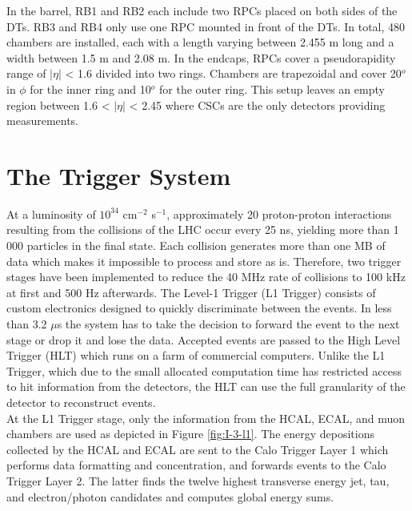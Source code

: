       In the barrel, RB1 and RB2 each include two RPCs placed on both sides of the DTs. RB3 and RB4 only use one RPC mounted in front of the DTs. In total, 480 chambers are installed, each with a length varying between 2.455 m long and a width between 1.5 m and 2.08 m. In the endcaps, RPCs cover a pseudorapidity range of $ | \eta | $ < 1.6 divided into two rings. Chambers are trapezoidal and cover 20$^o$ in $ \phi $ for the inner ring and 10$^o$ for the outer ring. This setup leaves an empty region between 1.6 < $ | \eta | $ < 2.45 where CSCs are the only detectors providing measurements.

  \section{The Trigger System}

    At a luminosity of $ 10^{34} $ cm$^{-2}$ s$^{-1}$, approximately 20 proton-proton interactions resulting from the collisions of the LHC occur every 25 ns, yielding more than 1 000 particles in the final state. Each collision generates more than one MB of data which makes it impossible to process and store as is. Therefore, two trigger stages have been implemented to reduce the 40 MHz rate of collisions to 100 kHz at first and 500 Hz afterwards. The Level-1 Trigger (L1 Trigger) consists of custom electronics designed to quickly discriminate between the events. In less than 3.2 $\mu$s the system has to take the decision to forward the event to the next stage or drop it and lose the data. Accepted events are passed to the High Level Trigger (HLT) which runs on a farm of commercial computers. Unlike the L1 Trigger, which due to the small allocated computation time has restricted access to hit information from the detectors, the HLT can use the full granularity of the detector to reconstruct events. \\

    At the L1 Trigger stage, only the information from the HCAL, ECAL, and muon chambers are used as depicted in Figure \ref{fig:I-3-l1}. The energy depositions collected by the HCAL and ECAL are sent to the Calo Trigger Layer 1 which performs data formatting and concentration, and forwards events to the Calo Trigger Layer 2. The latter finds the twelve highest transverse energy jet, tau, and electron/photon candidates and computes global energy sums. \\

